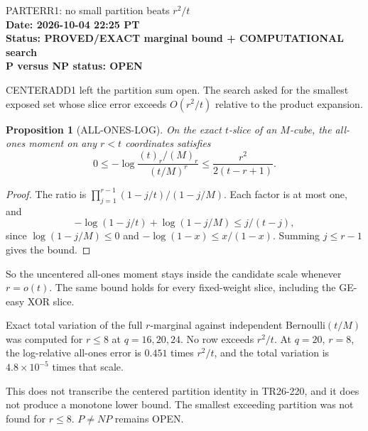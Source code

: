 \documentclass[11pt]{article}
\newtheorem{proposition}{Proposition}
\begin{document}
\begin{center}
{\Large PARTERR1: no small partition beats $r^2/t$}\\[4pt]
\textbf{Date: 2026-10-04 22:25 PT}\\
\textbf{Status: PROVED/EXACT marginal bound + COMPUTATIONAL search}\\
\textbf{P versus NP status: OPEN}
\end{center}

CENTERADD1 left the partition sum open. The search asked for the smallest exposed set whose slice error exceeds $O(r^2/t)$ relative to the product expansion.

\begin{proposition}[ALL-ONES-LOG]
On the exact $t$-slice of an $M$-cube, the all-ones moment on any $r<t$ coordinates satisfies
\[
0\le -\log\frac{(t)_r/(M)_r}{(t/M)^r}
\le \frac{r^2}{2(t-r+1)}.
\]
\end{proposition}
\begin{proof}
The ratio is $\prod_{j=1}^{r-1}(1-j/t)/(1-j/M)$. Each factor is at most one, and
\[
-\log(1-j/t)+\log(1-j/M)\le j/(t-j),
\]
since $\log(1-j/M)\le 0$ and $-\log(1-x)\le x/(1-x)$. Summing $j\le r-1$ gives the bound.
\end{proof}

So the uncentered all-ones moment stays inside the candidate scale whenever $r=o(t)$. The same bound holds for every fixed-weight slice, including the GE-easy XOR slice.

Exact total variation of the full $r$-marginal against independent Bernoulli$(t/M)$ was computed for $r\le 8$ at $q=16,20,24$. No row exceeds $r^2/t$. At $q=20$, $r=8$, the log-relative all-ones error is $0.451$ times $r^2/t$, and the total variation is $4.8\times 10^{-5}$ times that scale.

This does not transcribe the centered partition identity in TR26-220, and it does not produce a monotone lower bound. The smallest exceeding partition was not found for $r\le 8$. $P\ne NP$ remains OPEN.
\end{document}

